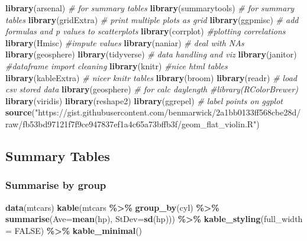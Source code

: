\documentclass[
]{article}
\newenvironment{Shaded}{\begin{snugshade}}{\end{snugshade}}
\newcommand{\AttributeTok}[1]{\textcolor[rgb]{0.13,0.29,0.53}{#1}}
\newcommand{\CommentTok}[1]{\textcolor[rgb]{0.56,0.35,0.01}{\textit{#1}}}
\newcommand{\ConstantTok}[1]{\textcolor[rgb]{0.56,0.35,0.01}{#1}}
\newcommand{\FunctionTok}[1]{\textcolor[rgb]{0.13,0.29,0.53}{\textbf{#1}}}
\newcommand{\NormalTok}[1]{#1}
\newcommand{\SpecialCharTok}[1]{\textcolor[rgb]{0.81,0.36,0.00}{\textbf{#1}}}
\newcommand{\StringTok}[1]{\textcolor[rgb]{0.31,0.60,0.02}{#1}}
\begin{document}
\begin{Shaded}
\begin{Highlighting}[]
\FunctionTok{library}\NormalTok{(arsenal) }\CommentTok{\# for summary tables}
\FunctionTok{library}\NormalTok{(summarytools) }\CommentTok{\# for summary tables}
\FunctionTok{library}\NormalTok{(gridExtra) }\CommentTok{\# print multiple plots as grid}
\FunctionTok{library}\NormalTok{(ggpmisc) }\CommentTok{\# add formulas and p values to scatterplots}
\FunctionTok{library}\NormalTok{(corrplot) }\CommentTok{\#plotting correlations}
\FunctionTok{library}\NormalTok{(Hmisc) }\CommentTok{\#impute values}
\FunctionTok{library}\NormalTok{(naniar) }\CommentTok{\# deal with NAs}
\FunctionTok{library}\NormalTok{(geosphere)}
\FunctionTok{library}\NormalTok{(tidyverse) }\CommentTok{\# data handling and viz}
\FunctionTok{library}\NormalTok{(janitor) }\CommentTok{\#dataframe import cleaning}
\FunctionTok{library}\NormalTok{(knitr) }\CommentTok{\#nice html tables}
\FunctionTok{library}\NormalTok{(kableExtra) }\CommentTok{\# nicer knitr tables}
\FunctionTok{library}\NormalTok{(broom)}
\FunctionTok{library}\NormalTok{(readr) }\CommentTok{\# load csv stored data}
\FunctionTok{library}\NormalTok{(geosphere) }\CommentTok{\# for calc daylength}
\CommentTok{\#library(RColorBrewer)}
\FunctionTok{library}\NormalTok{(viridis)}
\FunctionTok{library}\NormalTok{(reshape2)}
\FunctionTok{library}\NormalTok{(ggrepel) }\CommentTok{\# label points on ggplot}
\FunctionTok{source}\NormalTok{(}\StringTok{"https://gist.githubusercontent.com/benmarwick/2a1bb0133ff568cbe28d/raw/fb53bd97121f7f9ce947837ef1a4c65a73bffb3f/geom\_flat\_violin.R"}\NormalTok{)}
\end{Highlighting}
\end{Shaded}

\hypertarget{summary-tables}{%
\subsection{Summary Tables}\label{summary-tables}}

\hypertarget{summarise-by-group}{%
\subsubsection{Summarise by group}\label{summarise-by-group}}

\begin{Shaded}
\begin{Highlighting}[]
\FunctionTok{data}\NormalTok{(mtcars)}
\FunctionTok{kable}\NormalTok{(mtcars }\SpecialCharTok{\%\textgreater{}\%} \FunctionTok{group\_by}\NormalTok{(cyl) }\SpecialCharTok{\%\textgreater{}\%} \FunctionTok{summarise}\NormalTok{(}\AttributeTok{Ave=}\FunctionTok{mean}\NormalTok{(hp), }\AttributeTok{StDev=}\FunctionTok{sd}\NormalTok{(hp))) }\SpecialCharTok{\%\textgreater{}\%} 
  \FunctionTok{kable\_styling}\NormalTok{(}\AttributeTok{full\_width =} \ConstantTok{FALSE}\NormalTok{) }\SpecialCharTok{\%\textgreater{}\%} \FunctionTok{kable\_minimal}\NormalTok{()}
\end{Highlighting}
\end{Shaded}
\end{document}
